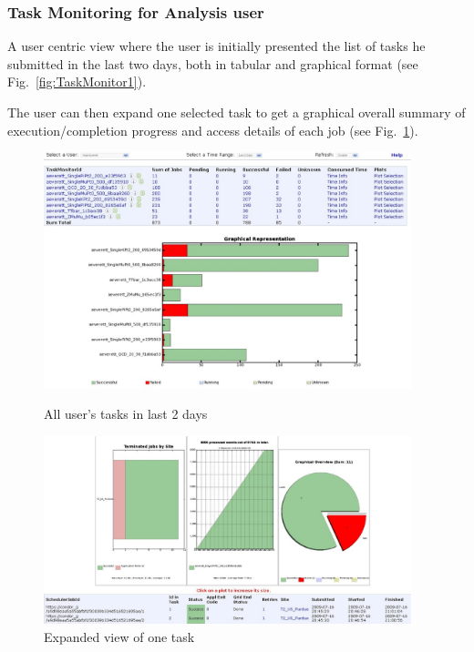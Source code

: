 \subsubsection{Task Monitoring for Analysis user}
A user centric view where the user is
initially presented the list of tasks he submitted in the last
two days, both in tabular and graphical format (see Fig.~\ref{fig:TaskMonitor1}).

The user can then expand one selected task to get
a graphical overall summary of execution/completion progress
and access details of each job (see Fig.~\ref{fig:TaskMonitor2}).

\begin{figure}
\begin{minipage}{.45\textwidth}
\centering
 \includegraphics[width=0.95\textwidth]{TaskMonitor1.eps}
\caption{All user's tasks in last 2 days}
\label{fig:TaskMonitor1}
\end{minipage}
\begin{minipage}{.45\textwidth}
\centering
\includegraphics[width=0.95\textwidth]{TaskMonitor2.eps}
\caption{Expanded view of one task}
\label{fig:TaskMonitor2}
\end{minipage}
\end{figure}

